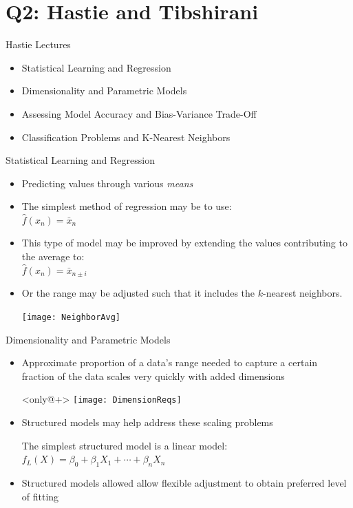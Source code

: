 \documentclass{beamer}
\begin{document}
\section[Q2]{Q2: Hastie and Tibshirani}

\begin{frame}{Hastie Lectures}
	\begin{itemize}
		\item Statistical Learning and Regression
		\item Dimensionality and Parametric Models
		\item Assessing Model Accuracy and Bias-Variance Trade-Off
		\item Classification Problems and K-Nearest Neighbors
	\end{itemize}
\end{frame}

\begin{frame}{Statistical Learning and Regression}
	\begin{itemize}[<+->]
		\item Predicting values through various \emph{means}
		\item The simplest method of regression may be to use: \\ 
			\vspace{0.5em} \hspace{4em} $ \hat{f}(x_n) = \bar{x}_n $
		\item This type of model may be improved by extending the values contributing to the average	to: \\ 
			\vspace{0.5em} \hspace{4em} $ \hat{f}(x_n) = \bar{x}_{n\pm i} $
		\item Or the range may be adjusted such that it includes the $k$-nearest neighbors.
		\item[] \hspace{4em} \texttt{[image: NeighborAvg]}
	\end{itemize}
\end{frame}

\begin{frame}[t]{Dimensionality and Parametric Models}
	\begin{itemize}[<+->]
		\item Approximate proportion of a data's range needed to capture a certain fraction of the data scales very quickly with added dimensions
		\item[]<only@+> \vspace{0.5em} \hspace{4em}
			\texttt{[image: DimensionReqs]}
		\item Structured models may help address these scaling problems
		\item[] The simplest structured model is a linear model: \\
			\vspace{0.5em} \hspace{4em} 
			$ f_L(X) = \beta_0 + \beta_1X_1 + \cdots + \beta_nX_n $
		\item Structured models allowed allow flexible adjustment to obtain preferred level of fitting
	\end{itemize}
\end{frame}
\end{document}
